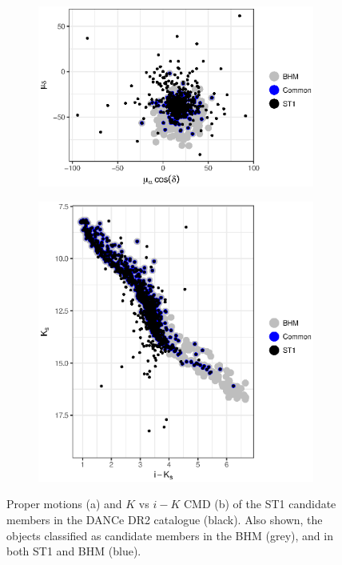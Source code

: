 \begin{figure}[ht!]
    \centering
    \begin{subfigure}[t]{0.45\textwidth}
    \centering
       \includegraphics[width=\textwidth]{background/Figures/ST1_pm.eps}
        \caption{}
    \end{subfigure}
    \begin{subfigure}[t]{0.45\textwidth}
    \centering
     \includegraphics[width=\textwidth]{background/Figures/ST1_ph.eps}
        \caption{}
    \end{subfigure}
\caption{Proper motions (a) and $K$ vs $i-K$ CMD (b) of the ST1 candidate members in the DANCe DR2 catalogue (black). Also shown, the objects classified as candidate members  in the BHM (grey), and in both ST1 and BHM (blue).}
\label{fig:ST1}
\end{figure}

